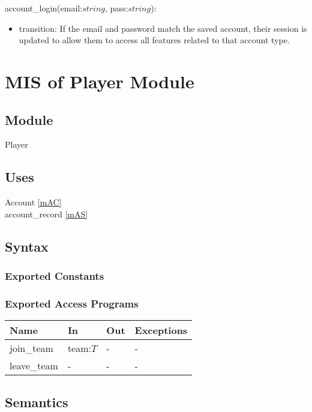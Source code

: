 \documentclass[12pt, titlepage]{article}
\begin{document}
\noindent account\_login(email:$string$, pass:$string$):
\begin{itemize}
\item transition: If the email and password match the saved account, their
session is updated to allow them to access all features related to that
account type.
\end{itemize}

\newpage

\section{MIS of Player Module} \label{mPL}

\subsection{Module}

Player

\subsection{Uses}

Account \ref{mAC}\\
account\_record \ref{mAS}

\subsection{Syntax}

\subsubsection{Exported Constants}

\subsubsection{Exported Access Programs}

\begin{center}
\begin{tabular}{p{2cm} p{4cm} p{4cm} p{2cm}}
\hline
\textbf{Name} & \textbf{In} & \textbf{Out} & \textbf{Exceptions} \\
\hline
join\_team & team:$T$ & - & - \\
leave\_team & - & - & - \\
\hline
\end{tabular}
\end{center}

\subsection{Semantics}
\end{document}
